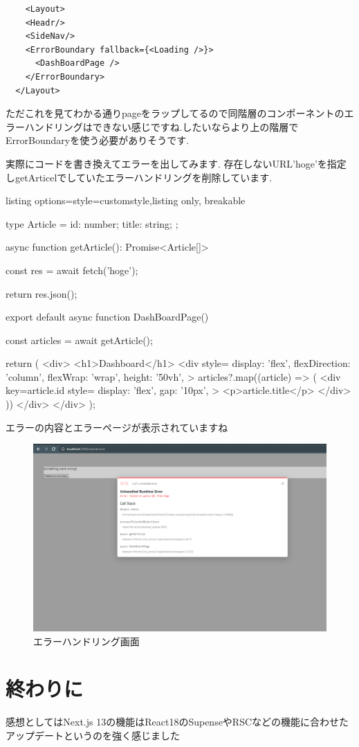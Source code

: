 \begin{tcolorbox}[breakable]
  \begin{verbatim}
    <Layout>
    <Headr/>
    <SideNav/>
    <ErrorBoundary fallback={<Loading />}>
      <DashBoardPage />
    </ErrorBoundary>
  </Layout>
  \end{verbatim}
\end{tcolorbox}


ただこれを見てわかる通りpageをラップしてるので同階層のコンポーネントのエラーハンドリングはできない感じですね.したいならより上の階層でErrorBoundaryを使う必要がありそうです.

実際にコードを書き換えてエラーを出してみます.
存在しないURL'hoge'を指定しgetArticelでしていたエラーハンドリングを削除しています.


\begin{tcblisting}{listing options={style=customstyle},listing only, breakable}

  type Article = {
  id: number;
  title: string;
  };

  async function getArticle(): Promise<Article[]> {
      const res = await fetch('hoge');

      return res.json();
    }

  export default async function DashBoardPage() {
  const articles = await getArticle();

  return (
  <div>
  <h1>Dashboard</h1>
  <div
  style={{
      display: 'flex',
      flexDirection: 'column',
      flexWrap: 'wrap',
      height: '50vh',
    }}
  >
  {articles?.map((article) => (
  <div
  key={article.id}
  style={{
      display: 'flex',
      gap: '10px',
    }}
  >
    <p>{article.title}</p>
  </div>
  ))}
  </div>
  </div>
  );
  }

\end{tcblisting}


エラーの内容とエラーページが表示されていますね


\begin{figure}[H]
  \centering
  \includegraphics[width=12cm]{./image/03-Tech/chap4/08.png}
  \caption{エラーハンドリング画面}
\end{figure}



\section{終わりに}
感想としてはNext.js 13の機能はReact18のSupenseやRSCなどの機能に合わせたアップデートというのを強く感じました